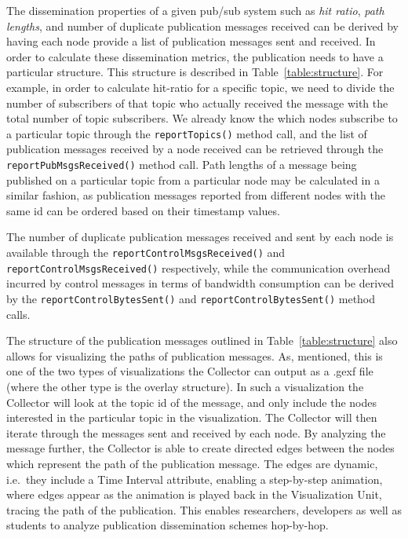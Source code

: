 The dissemination properties of a given pub/sub system such as
\emph{hit ratio}, \emph{path lengths}, and number of duplicate publication
messages received can be derived by having each node provide a list of
publication messages sent and received. In order to calculate these
dissemination metrics, the publication needs to have a particular
structure. This structure is described in Table~\ref{table:structure}.
For example, in order to calculate hit-ratio for a specific topic, we
need to divide the number of subscribers of that topic who actually
received the message with the total number of topic subscribers. We
already know the which nodes subscribe to a particular topic through the
\texttt{reportTopics()} method call, and the list of publication
messages received by a node received can be retrieved through the
\texttt{reportPubMsgsReceived()} method call. Path lengths of a
message being published on a particular topic from a particular node may
be calculated in a similar fashion, as publication messages reported from
different nodes with the same id can be ordered based on their timestamp
values.

The number of duplicate publication messages received and sent by each
node is available through the \texttt{reportControlMsgsReceived()}  and
\texttt{reportControlMsgsReceived()} respectively, while the communication
overhead incurred by control messages in terms of bandwidth consumption can be
derived by the \texttt{reportControlBytesSent()} and
\texttt{reportControlBytesSent()} method calls.



The structure of the publication messages outlined in
Table~\ref{table:structure} also allows for visualizing the paths of
publication messages. As, mentioned, this is one of the two types of
visualizations the Collector can output as a .gexf file (where the other
type is the overlay structure). In such a visualization the Collector
will look at the topic id of the message, and only include the nodes
interested in the particular topic in the visualization. The Collector
will then iterate through the messages sent and received by each node.
By analyzing the message further, the Collector is able to create
directed edges between the nodes which represent the path of the
publication message. The edges are dynamic, i.e.\ they include a Time
Interval attribute, enabling a step-by-step animation, where edges
appear as the animation is played back in the Visualization Unit,
tracing the path of the publication. This enables researchers,
developers as well as students to analyze publication dissemination
schemes hop-by-hop.


